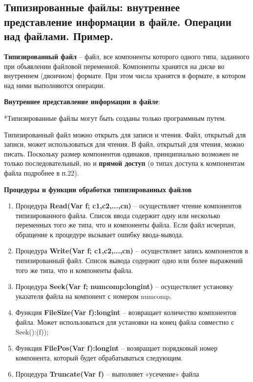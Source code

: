 



\newpage\subsection{Типизированные  файлы:  внутреннее  представление  информации  в  файле.  Операции  над 
файлами. Пример. }

\begin{myquote}
            
\end{myquote}

{\bf Типизированный файл} – файл, все компоненты которого одного типа, заданного при объявлении файловой переменной. 
Компоненты хранятся на диске во внутреннем (двоичном) формате. При этом числа хранятся в формате, в котором над ними выполняются операции. 

{\bf{Внутреннее  представление  информации  в  файле}}:

*Типизированные файлы могут быть созданы только программным путем.

Типизированный файл можно открыть для записи и чтения. Файл, открытый для записи, может использоваться для чтения. В файл, открытый для чтения, можно писать.  
Поскольку размер компонентов одинаков, принципиально возможен не только последовательный, но и {\bf{прямой доступ}} (о типах доступа к компонентам файла подробнее в п.22). 

{\bf Процедуры и функции обработки типизированных файлов}

\begin{enumerate}
\item Процедура {\bf Read(Var f; c1,c2,...,cn)} – осуществляет чтение компонентов типизированного файла. Список ввода содержит одну или несколько переменных того же типа, что и компоненты файла. Если файл исчерпан, обращение к процедуре вызывает ошибку ввода-вывода.

\item Процедура {\bf Write(Var f; c1,c2,...,cn)} – осуществляет запись компонентов в типизированный файл.  Список вывода содержит одно или более выражений того же типа, что и компоненты файла.

\item Процедура {\bf Seek(Var f; numcomp:longint)} – осуществляет установку указателя файла на компонент с номером numcomp.

\item Функция {\bf FileSize(Var f):longint} – возвращает количество компонентов файла. Может использоваться для установки на конец файла совместно с Seek():(f));

\item Функция {\bf FilePos(Var f):longint} –  возвращает порядковый номер компонента, который будет обрабатываться следующим.

\item  Процедура {\bf Truncate(Var f)} – выполняет «усечение» файла
\end{enumerate}

